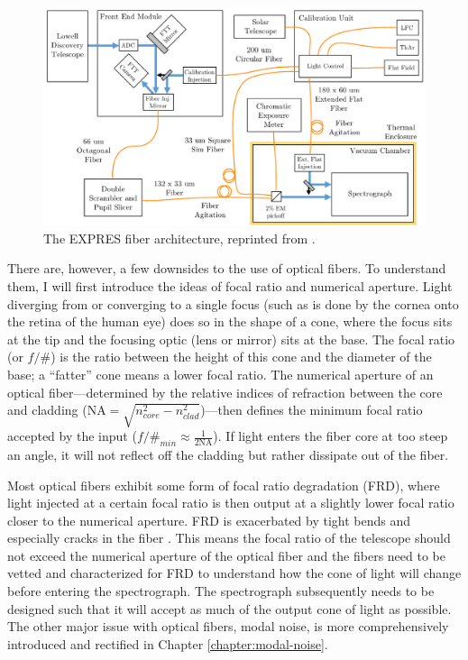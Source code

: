\begin{figure}
    \centering
    \includegraphics[width=\textwidth]{figures-1/expres_schematic_fibersV3.pdf}
    \caption[The EXPRES Fiber Architecture]{The EXPRES fiber architecture, reprinted from \citet{blackman_performance_2020}.}
    \label{fig:expres-fibers}
\end{figure}

There are, however, a few downsides to the use of optical fibers. To understand them, I will first introduce the ideas of focal ratio and numerical aperture. Light diverging from or converging to a single focus (such as is done by the cornea onto the retina of the human eye) does so in the shape of a cone, where the focus sits at the tip and the focusing optic (lens or mirror) sits at the base. The focal ratio (or $f/\#$) is the ratio between the height of this cone and the diameter of the base; a ``fatter'' cone means a lower focal ratio. The numerical aperture of an optical fiber---determined by the relative indices of refraction between the core and cladding ($\mathrm{NA}=\sqrt{n_{core}^2-n_{clad}^2}$)---then defines the minimum focal ratio accepted by the input ($f/\#_{min} \approx \frac{1}{2\mathrm{NA}}$). If light enters the fiber core at too steep an angle, it will not reflect off the cladding but rather dissipate out of the fiber.

Most optical fibers exhibit some form of focal ratio degradation (FRD), where light injected at a certain focal ratio is then output at a slightly lower focal ratio closer to the numerical aperture. FRD is exacerbated by tight bends and especially cracks in the fiber \citep{ramsey_focal_1988}. This means the focal ratio of the telescope should not exceed the numerical aperture of the optical fiber and the fibers need to be vetted and characterized for FRD to understand how the cone of light will change before entering the spectrograph. The spectrograph subsequently needs to be designed such that it will accept as much of the output cone of light as possible. The other major issue with optical fibers, modal noise, is more comprehensively introduced and rectified in Chapter \ref{chapter:modal-noise}.

